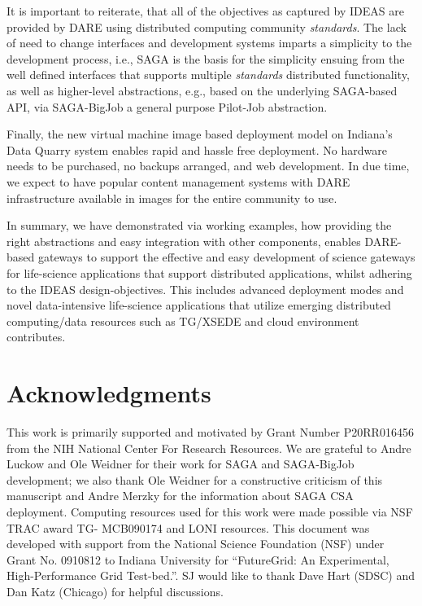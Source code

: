 \documentclass[]{svjour3}
\begin{document}
It is important to reiterate, that all of the objectives as captured
by IDEAS are provided by DARE using distributed computing community
{\it standards}. The lack of need to change interfaces and development
systems imparts a simplicity to the development process, i.e., SAGA is
the basis for the simplicity ensuing from the well defined interfaces
that supports multiple {\it standards} distributed functionality, as
well as higher-level abstractions, e.g., based on the underlying
SAGA-based API, via SAGA-BigJob a general purpose Pilot-Job
abstraction.

Finally, the new virtual machine image based deployment model on
Indiana's Data Quarry system enables rapid and hassle free
deployment. No hardware needs to be purchased, no backups arranged,
and web development. In due time, we expect to have popular content
management systems with DARE infrastructure available in images for
the entire community to use.

In summary, we have demonstrated via working examples, how providing
the right abstractions and easy integration with other components,
enables DARE-based gateways to support the effective and easy
development of science gateways for life-science applications that
support distributed applications, whilst adhering to the IDEAS
design-objectives. This includes advanced deployment modes and novel
data-intensive life-science applications that utilize emerging
distributed computing/data resources such as TG/XSEDE and cloud
environment contributes.

\section*{Acknowledgments}
This work is primarily supported and motivated by Grant Number
P20RR016456 from the NIH National Center For Research Resources. We
are grateful to Andre Luckow and Ole Weidner for their work for SAGA
and SAGA-BigJob development; we also thank Ole Weidner for a
constructive criticism of this manuscript and Andre Merzky for the information
about SAGA CSA deployment. Computing resources used for this work were made possible via NSF TRAC award TG-
MCB090174 and LONI resources. This document was developed with support from the
National Science Foundation (NSF) under Grant No. 0910812 to Indiana
University for ``FutureGrid: An Experimental, High-Performance Grid
Test-bed.''. SJ would like to thank Dave Hart (SDSC) and Dan Katz
(Chicago) for helpful discussions.



%

%

\end{document}
